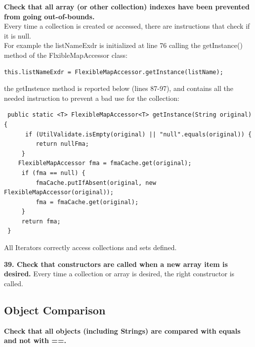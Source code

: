 \documentclass{article}
\begin{document}
\begin{flushleft}
\textbf{Check that all array (or other collection) indexes have been prevented from going out-of-bounds.}\\
\vspace{0.5cm}
Every time a collection is created or accessed, there are instructions that check if it is null. \\
\vspace{0.5cm}
For example the listNameExdr is initialized at line 76 calling the getInstance() method of the FlxibleMapAccessor class:\\
\vspace{0.5cm}
\begin{lstlisting}
this.listNameExdr = FlexibleMapAccessor.getInstance(listName); 
\end{lstlisting}
\vspace{0.5cm}
the getInstence method is reported below (lines 87-97), and contains all the needed instruction to prevent a bad use for the collection:\\
\vspace{0.5cm}
\begin{lstlisting}
 public static <T> FlexibleMapAccessor<T> getInstance(String original) {
      if (UtilValidate.isEmpty(original) || "null".equals(original)) {
         return nullFma;
     }
    FlexibleMapAccessor fma = fmaCache.get(original);
     if (fma == null) {
         fmaCache.putIfAbsent(original, new FlexibleMapAccessor(original));
         fma = fmaCache.get(original);
     }
     return fma;
 }
\end{lstlisting}    
 \vspace{0.5cm}   
All Iterators correctly access collections and sets defined.  \\ 
\vspace{0.5cm}
    
 \textbf{39. Check that constructors are called when a new array item is desired.}
 \vspace{0.5cm}
 Every time a collection or array is desired, the right constructor is called.\\
 \vspace{0.5cm}





\subsection{Object Comparison}
\textbf{Check that all objects (including Strings) are compared with equals and not with ==.}\\
\vspace{0.5cm}


\end{flushleft}
\end{document}
